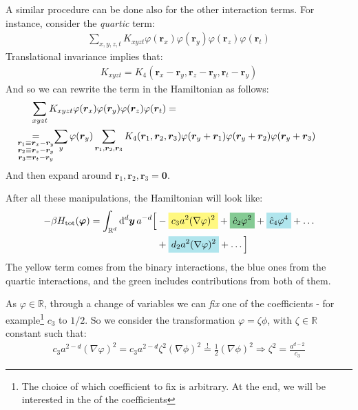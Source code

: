 \documentclass[../../main.tex]{subfiles}
\begin{document}
A similar procedure can be done also for the other interaction terms. For instance, consider the \textit{quartic} term:
\begin{align*}
    \sum_{x,y,z,t} K_{xyzt} \varphi(\bm{r}_x) \varphi(\bm{r}_y) \varphi(\bm{r}_z) \varphi(\bm{r}_t)
\end{align*} 
Translational invariance implies that:
\begin{align*}
    K_{xyzt} = K_4(\bm{r}_x-\bm{r}_y, \bm{r}_z-\bm{r}_y, \bm{r}_t-\bm{r}_y)
\end{align*}
And so we can rewrite the term in the Hamiltonian as follows:
\begin{align*}
    \sum_{xyzt} K_{xyzt} \varphi(\bm{r}_x) \varphi(\bm{r}_y) \varphi(\bm{r}_z) \varphi(\bm{r}_t) =\\
    \underset{\mathclap{\substack{
        \bm{r}_1 \equiv \bm{r}_x - \bm{r}_y\\
        \bm{r}_2 \equiv \bm{r}_z - \bm{r}_y\\
        \bm{r}_3 \equiv \bm{r}_t - \bm{r}_y
    }}}{=}\quad\>  \sum_y \varphi(\bm{r}_y) \sum_{\bm{r}_1, \bm{r}_2, \bm{r}_3} K_4(\bm{r}_1, \bm{r}_2, \bm{r}_3) \varphi(\bm{r}_y + \bm{r}_1) \varphi(\bm{r}_y + \bm{r}_2) \varphi(\bm{r}_y + \bm{r}_3)\span
\end{align*}
And then expand around $\bm{r}_1, \bm{r}_2, \bm{r}_3 = \bm{0}$.

\medskip

After all these manipulations, the Hamiltonian will look like:
\begin{align*}
    - \beta H_{\mathrm{tot}}(\bm{\varphi}) = \int_{\mathbb{R}^d} \dd[d]{\bm{y}} a^{-d} \Big[&-\hlc{Yellow}{c_3 a^2 (\nabla \varphi)^2 }+ \hlc{ForestGreen}{\hat{c}_2 \varphi^2 }+ \hlc{SkyBlue}{\hat{c}_4 \varphi^4 }+ \dots \\
    &+\hlc{SkyBlue}{d_2 a^2 (\nabla \varphi)^2 }+ \dots \Big]
\end{align*}
The yellow term comes from the binary interactions, the blue ones from the quartic interactions, and the green includes contributions from both of them.

\medskip

As $\varphi \in \mathbb{R}$, through a change of variables we can \textit{fix} one of the coefficients - for example\footnote{The choice of which coefficient to fix is arbitrary. At the end, we will be interested in the  of the coefficients} $c_3$ to $1/2$. So we consider the transformation $\varphi = \zeta \phi$, with $\zeta \in \mathbb{R}$ constant such that:
\begin{align*}
    c_3 a^{2-d} (\nabla \varphi)^2 = c_3 a^{2-d}\zeta^2(\nabla \phi)^2 \overset{!}{=}  \frac{1}{2} (\nabla \phi)^2 \Rightarrow \zeta^2 = \frac{a^{d-2}}{c_3} 
\end{align*}  
\end{document}
